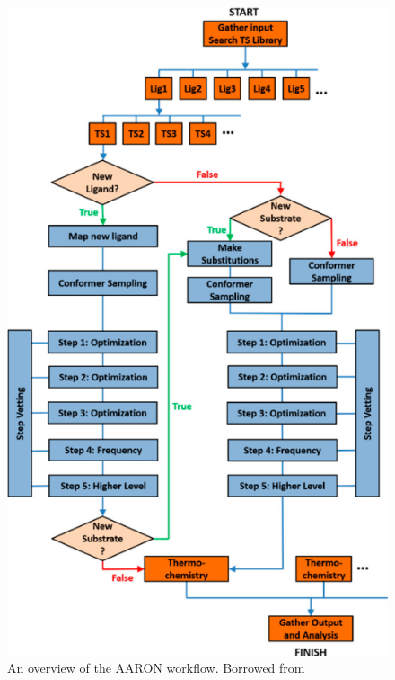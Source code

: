 \documentclass[preprint, 11pt]{elsarticle} %
\begin{document}
\begin{figure}
    \centering
    \includegraphics{aaron_workflow}
    \caption{An overview of the AARON workflow. Borrowed from \cite{Guan:2018}}
    \label{fig:aaron_workflow}
\end{figure}
\end{document}
